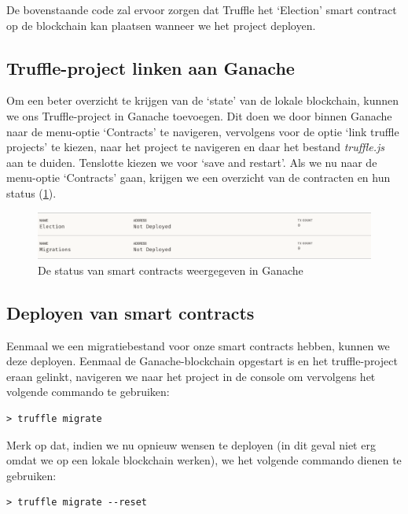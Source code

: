 	De bovenstaande code zal ervoor zorgen dat Truffle het `Election' smart contract op de blockchain kan plaatsen wanneer we het project deployen.
	
	\subsection{Truffle-project linken aan Ganache}
	
	Om een beter overzicht te krijgen van de `state' van de lokale blockchain, kunnen we ons Truffle-project in Ganache toevoegen. Dit doen we door binnen Ganache naar de menu-optie `Contracts' te navigeren, vervolgens voor de optie `link truffle projects'  te kiezen, naar het project te navigeren en daar het bestand \textit{truffle.js} aan te duiden. Tenslotte  kiezen we voor `save and restart'. Als we nu naar de menu-optie `Contracts' gaan, krijgen we een overzicht van de contracten en hun status (\ref{fig:contracts-ganache1}).
	
	\begin{figure}
		\includegraphics[width=\linewidth]{img/contracts-ganache1.png}
		\caption{De status van smart contracts weergegeven in Ganache}
		\label{fig:contracts-ganache1}
	\end{figure}
	
	
	\subsection{Deployen van smart contracts}
	
	Eenmaal we een migratiebestand voor onze smart contracts hebben, kunnen we deze deployen. Eenmaal de Ganache-blockchain opgestart is en het truffle-project eraan gelinkt, navigeren we naar het project in de console om vervolgens het volgende commando te gebruiken:
	
	\begin{lstlisting}[numbers=none]
	> truffle migrate
	\end{lstlisting}
	
	Merk op dat, indien we nu opnieuw wensen te deployen (in dit geval niet erg omdat we op een lokale blockchain werken), we het volgende commando dienen te gebruiken:
	
	\begin{lstlisting}[numbers=none]
	> truffle migrate --reset
	\end{lstlisting}
	
